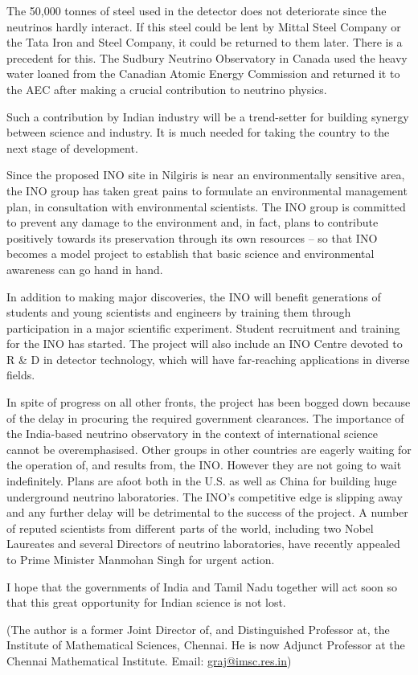 The 50,000 tonnes of steel used in the detector does not deteriorate since the neutrinos hardly interact. If this steel could be lent by Mittal Steel Company or the Tata Iron and Steel Company, it could be returned to them later. There is a precedent for this. The Sudbury Neutrino Observatory in Canada used the heavy water loaned from the Canadian Atomic Energy Commission and returned it to the AEC after making a crucial contribution to neutrino physics.

Such a contribution by Indian industry will be a trend-setter for building synergy between science and industry. It is much needed for taking the country to the next stage of development.

Since the proposed INO site in Nilgiris is near an environmentally sensitive area, the INO group has taken great pains to formulate an environmental management plan, in consultation with environmental scientists. The INO group is committed to prevent any damage to the environment and, in fact, plans to contribute positively towards its preservation through its own resources – so that INO becomes a model project to establish that basic science and environmental awareness can go hand in hand.

In addition to making major discoveries, the INO will benefit generations of students and young scientists and engineers by training them through participation in a major scientific experiment. Student recruitment and training for the INO has started. The project will also include an INO Centre devoted to R \& D in detector technology, which will have far-reaching applications in diverse fields.

In spite of progress on all other fronts, the project has been bogged down because of the delay in procuring the required government clearances.
The importance of the India-based neutrino observatory in the context of international science cannot be overemphasised. Other groups in other countries are eagerly waiting for the operation of, and results from, the INO. However they are not going to wait indefinitely. Plans are afoot both in the U.S. as well as China for building huge underground neutrino laboratories. The INO’s competitive edge is slipping away and any further delay will be detrimental to the success of the project. A number of reputed scientists from different parts of the world, including two Nobel Laureates and several Directors of neutrino laboratories, have recently appealed to Prime Minister Manmohan Singh for urgent action.

I hope that the governments of India and Tamil Nadu together will act soon so that this great opportunity for Indian science is not lost.

(The author is a former Joint Director of, and Distinguished Professor at, the Institute of Mathematical Sciences, Chennai. He is now Adjunct Professor at the Chennai Mathematical Institute. Email: \url{graj@imsc.res.in})

